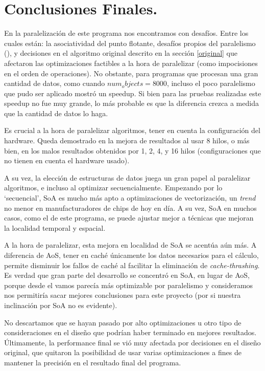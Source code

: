 \documentclass{article}
\begin{document}
\section{Conclusiones Finales.\label{conclusiones}}
En la paralelización de este programa nos encontramos con desafíos. Entre los cuales están: la asociatividad
del punto flotante, desafíos propios del paralelismo (), y decisiones en el algoritmo original descrito en
la sección \ref{original} que afectaron las optimizaciones factibles a la hora de paralelizar (como impocisiones
en el orden de operaciones). No obstante, para programas que procesan una gran cantidad de datos, como cuando ${num_objects=8000}$,
incluso el poco paralelismo que pudo ser aplicado mostró un speedup. Si bien para las pruebas realizadas este speedup no fue
muy grande, lo más probable es que la diferencia crezca a medida que la cantidad de datos lo haga.


Es crucial a la hora de paralelizar algoritmos, tener en cuenta la configuración del hardware. Queda demostrado
en la mejora de resultados al usar 8 hilos, o más bien, en los malos resultados obtenidos por 1, 2, 4, y 16 hilos (configuraciones
que no tienen en cuenta el hardware usado).


A su vez, la elección de estructuras de datos juega un gran papel al paralelizar algoritmos, e incluso al optimizar secuencialmente.
Empezando por lo `secuencial', SoA es mucho más apto a optimizaciones de vectorización, un \textit{trend} no menor en manufacturadores
de chips de hoy en día. A su vez, SoA en muchos casos, como el de este programa, se puede ajustar mejor a técnicas que mejoran
la localidad temporal y espacial.

A la hora de paralelizar, esta mejora en localidad de SoA se acentúa aún más. A diferencia de AoS, tener en caché únicamente
los datos necesarios para el cálculo, permite disminuir los fallos de caché al
facilitar la eliminación de \textit{cache-thrashing}. Es verdad que gran parte del desarrollo se concentró en SoA, en lugar de AoS, porque
desde el vamos parecía más optimizable por paralelismo y consideramos nos permitiría sacar mejores conclusiones para este proyecto (por
si nuestra inclinación por SoA no es evidente).

No descartamos que se hayan pasado por alto optimizaciones u otro tipo de consideraciones
en el diseño que podrían haber terminado en mejores resultados. Últimamente, la performance final se vió muy
afectada por decisiones en el diseño original, que quitaron la posibilidad de usar varias optimizaciones
a fines de mantener la precisión en el resultado final del programa.
\printbibliography
\end{document}
